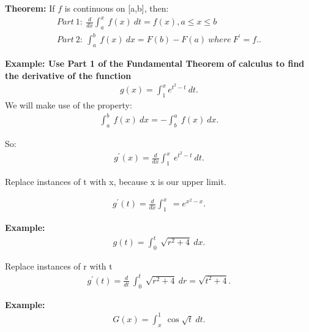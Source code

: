 \documentclass{report}
\begin{document}
\bigbreak
\begin{mdframed}
  \textbf{Theorem:}
  \smallbreak \noindent \smallbreak \noindent
  If $f$ is continuous on [a,b], then:
  \begin{align*}
    Part\ 1:\ \frac{d}{dx}\int_{a}^{x}\ f(x)\ dt  = f(x), a \leq x \leq b         \\
    Part\ 2:\ \int_{a}^{b}\ f(x)\ dx = F(b) - F(a)\ where\ F^{\prime} = f.
  .\end{align*}
\end{mdframed}

\bigbreak \noindent 
\begin{mdframed}
  \textbf{Example: Use Part 1 of the Fundamental Theorem of calculus to find the derivative of the function}
  \begin{align*}
    g(x) = \int_{1}^{x}e^{t^{2} -t}\ dt
  .\end{align*}
  \bigbreak \noindent \bigbreak \noindent
  We will make use of the property:
  \begin{align*}
    \int_{a}^{b}\ f(x)\ dx = -\int_{b}^{a}\ f(x)\ dx
  .\end{align*}
\end{mdframed}
\bigbreak \noindent \bigbreak \noindent
So:
\begin{align*}
  g^{\prime}(x) = \frac{d}{dx}\int_{1}^{x}\ e^{t^{2}-t}\ dt
.\end{align*}

\bigbreak \noindent \bigbreak \noindent
Replace instances of t with x, because x is our upper limit.

\begin{align*}
  g^{\prime}(t) = \frac{d}{dx} \int_{1}^{x}\  = \boxed{e^{x^{2}-x}}
.\end{align*}

\bigbreak \noindent 
\begin{mdframed}
  \textbf{Example: }
  \begin{align*}
    g(t) = \int_{0}^{t}\ \sqrt{r^{2}+4}\ dx
  .\end{align*}
\end{mdframed}

\bigbreak \noindent \bigbreak \noindent
Replace instances of r with t
\begin{align*}
  g^{\prime}(t) = \frac{d}{dt}\ \int_{0}^{t}\ \sqrt{r^{2}+ 4}\ dr = \boxed{\sqrt{t^{2} + 4}}
.\end{align*}

\pagebreak \bigbreak \noindent
\bigbreak \noindent 
\begin{mdframed}
  \textbf{Example: }
  \begin{align*}
    G(x) = \int_{x}^{1}\ \cos{\sqrt{t}}\ dt
  .\end{align*}
\end{mdframed}
\end{document}
